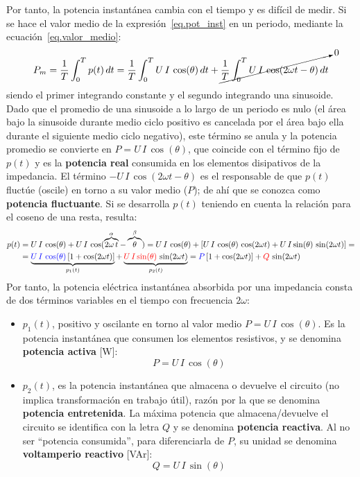 Por tanto, la potencia instantánea cambia con el tiempo y es difícil
de medir. Si se hace el valor medio de la
expresión~\eqref{eq.pot_inst} en un periodo, mediante la
ecuación~\eqref{eq.valor_medio}:
\begin{equation*}
  P_m=\dfrac{1}{T}\int_{0}^{T}p(t)\,dt=\dfrac{1}{T}\int_{0}^{T}U\,I\,\cos(\theta)\,dt+\cancelto{0}{\dfrac{1}{T}\int_{0}^{T}U\,I\,\cos(2\omega t-\theta)\,dt}
\end{equation*}
siendo el primer integrando constante y el segundo integrando una
sinusoide. Dado que el promedio de una sinusoide a lo largo de un
periodo es nulo (el área bajo la sinusoide durante medio ciclo
positivo es cancelada por el área bajo ella durante el siguiente medio
ciclo negativo), este término se anula y la potencia promedio se
convierte en $P=U\,I\,\cos(\theta)$, que coincide con el término fijo
de $p(t)$ y es la \textbf{potencia real} consumida en los elementos
disipativos de la impedancia. El término
$-U\,I\,\cos(2\omega t-\theta)$ es el responsable de que $p(t)$
fluctúe (oscile) en torno a su valor medio ($P$); de ahí que se
conozca como \textbf{potencia fluctuante}. Si se desarrolla $p(t)$
teniendo en cuenta la relación para el coseno de una resta, resulta:
\begin{align*}
  p(t)&=U\,I\,\cos(\theta)+U\,I\,\cos(\overbrace{2\omega\,t}^{\alpha}-\overbrace{\theta}^{\beta})=U\,I\,\cos(\theta)+\left[ U\,I\,\cos(\theta)\,\cos(2\omega t) + U\,I\sin(\theta)\,\sin(2\omega t)\right]=\\
      &=\underbrace{{\color{blue}U\,I\,\cos(\theta)}\left[1+\cos(2\omega t)\right]}_{p_1(t)} + \underbrace{{\color{red}U\,I\sin(\theta)}\,\sin(2\omega t)}_{p_2(t)}={\color{blue}P}\left[1+\cos(2\omega t)\right] + {\color{red}Q}\,\sin(2\omega t)
\end{align*}
Por tanto, la potencia eléctrica instantánea absorbida por una
impedancia consta de dos términos variables en el tiempo con
frecuencia $2\omega$:
\begin{itemize}
\item $p_1(t)$, positivo y oscilante en torno al valor medio
  $P=U\,I\,\cos(\theta)$. Es la potencia instantánea que consumen los
  elementos resistivos, y se denomina \textbf{potencia activa} [W]:
  \begin{equation}
    \boxed{P=U\,I\,\cos(\theta)}
  \end{equation}
\item $p_2(t)$, es la potencia instantánea que almacena o devuelve el
  circuito (no implica transformación en trabajo útil), razón por la
  que se denomina \textbf{potencia entretenida}. La máxima potencia
  que almacena/devuelve el circuito se identifica con la letra $Q$ y
  se denomina \textbf{potencia reactiva}. Al no ser ``potencia
  consumida'', para diferenciarla de $P$, su unidad se denomina
  \textbf{voltamperio reactivo} [VAr]:
  \begin{equation}
    \boxed{Q=U\,I\,\sin(\theta)}
  \end{equation}
\end{itemize}
	
